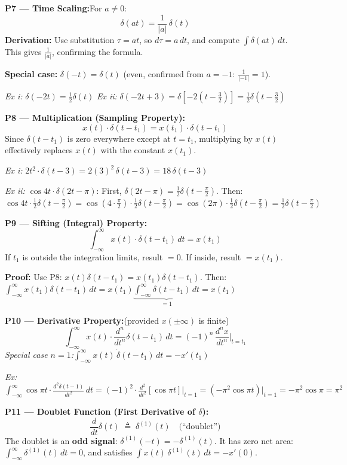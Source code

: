 \documentclass[10pt,a4paper]{article}
\begin{document}
\begin{propbox}
\smallskip
\textbf{P7 --- Time Scaling:}\quad For $a \neq 0$:
\[
\delta(at) = \frac{1}{|a|}\,\delta(t)
\]
\textbf{Derivation:} Use substitution $\tau = at$, so $d\tau = a\,dt$, and compute $\int\delta(at)\,dt$. This gives $\frac{1}{|a|}$, confirming the formula.

\textbf{Special case:} $\delta(-t) = \delta(t)$ (even, confirmed from $a=-1$: $\frac{1}{|-1|}=1$).

\quad\textit{Ex i:} $\delta(-2t) = \tfrac{1}{2}\delta(t)$ \qquad\textit{Ex ii:} $\delta(-2t+3) = \delta[-2(t-\tfrac{3}{2})] = \tfrac{1}{2}\delta(t-\tfrac{3}{2})$

\smallskip
\textbf{P8 --- Multiplication (Sampling Property):}
\[
x(t)\cdot\delta(t-t_1) = x(t_1)\cdot\delta(t-t_1)
\]
Since $\delta(t-t_1)$ is zero everywhere except at $t = t_1$, multiplying by $x(t)$ effectively replaces $x(t)$ with the constant $x(t_1)$.

\quad\textit{Ex i:} $2t^2\cdot\delta(t-3) = 2(3)^2\,\delta(t-3) = 18\,\delta(t-3)$

\quad\textit{Ex ii:} $\cos 4t\cdot\delta(2t-\pi)$: First, $\delta(2t-\pi) = \frac{1}{2}\delta(t-\frac{\pi}{2})$. Then:
$\cos 4t\cdot\frac{1}{2}\delta(t-\frac{\pi}{2}) = \cos(4\cdot\frac{\pi}{2})\cdot\frac{1}{2}\delta(t-\frac{\pi}{2}) = \cos(2\pi)\cdot\frac{1}{2}\delta(t-\frac{\pi}{2}) = \frac{1}{2}\delta(t-\frac{\pi}{2})$

\smallskip
\textbf{P9 --- Sifting (Integral) Property:}
\[
\int_{-\infty}^{\infty} x(t)\cdot\delta(t-t_1)\,dt = x(t_1)
\]
If $t_1$ is outside the integration limits, result $= 0$. If inside, result $= x(t_1)$.

\textbf{Proof:} Use P8: $x(t)\delta(t-t_1) = x(t_1)\delta(t-t_1)$. Then:
$\int_{-\infty}^{\infty}x(t_1)\delta(t-t_1)\,dt = x(t_1)\underbrace{\int_{-\infty}^{\infty}\delta(t-t_1)\,dt}_{=1} = x(t_1)$

\smallskip
\textbf{P10 --- Derivative Property:}\quad (provided $x(\pm\infty)$ is finite)
\[
\int_{-\infty}^{\infty} x(t)\cdot\frac{d^n}{dt^n}\delta(t-t_1)\,dt = (-1)^n\,\frac{d^n x}{dt^n}\bigg|_{t=t_1}
\]
\textit{Special case $n=1$:}\quad $\int_{-\infty}^{\infty}x(t)\,\dot{\delta}(t-t_1)\,dt = -x'(t_1)$

\quad\textit{Ex:} $\displaystyle\int_{-\infty}^{\infty}\cos\pi t\cdot\frac{d^2\delta(t-1)}{dt^2}\,dt = (-1)^2\cdot\frac{d^2}{dt^2}[\cos\pi t]\big|_{t=1} = (-\pi^2\cos\pi t)\big|_{t=1} = -\pi^2\cos\pi = \pi^2$

\smallskip
\textbf{P11 --- Doublet Function (First Derivative of $\delta$):}
\[
\frac{d}{dt}\delta(t) \;\triangleq\; \delta^{(1)}(t) \quad\text{(``doublet'')}
\]
The doublet is an \textbf{odd signal}: $\delta^{(1)}(-t) = -\delta^{(1)}(t)$.
It has zero net area: $\int_{-\infty}^{\infty}\delta^{(1)}(t)\,dt = 0$, and satisfies $\int x(t)\,\delta^{(1)}(t)\,dt = -x'(0)$.


\end{propbox}
\end{document}
